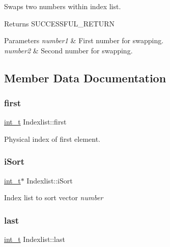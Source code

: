 Swaps two numbers within index list. \begin{DoxyReturn}{Returns}
S\+U\+C\+C\+E\+S\+S\+F\+U\+L\+\_\+\+R\+E\+T\+U\+RN 
\end{DoxyReturn}

\begin{DoxyParams}{Parameters}
{\em number1} & First number for swapping. \\
\hline
{\em number2} & Second number for swapping. \\
\hline
\end{DoxyParams}


\subsection{Member Data Documentation}
\mbox{\label{class_indexlist_ac5fcce8e0f9c81e2b437b00144413dcd}} 
\subsubsection{\texorpdfstring{first}{first}}
{\footnotesize\ttfamily \hyperlink{_types_8hpp_ab6fd6105e64ed14a0c9281326f05e623}{int\+\_\+t} Indexlist\+::first\hspace{0.3cm}{\ttfamily [protected]}}

Physical index of first element. \mbox{\label{class_indexlist_a7cb0be705b2f365bd0e2a02726159625}} 
\subsubsection{\texorpdfstring{i\+Sort}{iSort}}
{\footnotesize\ttfamily \hyperlink{_types_8hpp_ab6fd6105e64ed14a0c9281326f05e623}{int\+\_\+t}$\ast$ Indexlist\+::i\+Sort\hspace{0.3cm}{\ttfamily [protected]}}

Index list to sort vector {\itshape number} \mbox{\label{class_indexlist_a7c84090f4263d521f0c5ec586fdd83ad}} 
\subsubsection{\texorpdfstring{last}{last}}
{\footnotesize\ttfamily \hyperlink{_types_8hpp_ab6fd6105e64ed14a0c9281326f05e623}{int\+\_\+t} Indexlist\+::last\hspace{0.3cm}{\ttfamily [protected]}}

